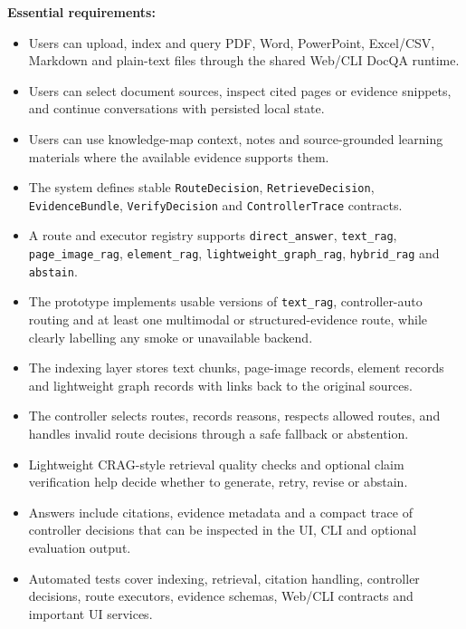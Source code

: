 \documentclass{article}
\begin{document}
\textbf{Essential requirements:}
\begin{itemize}
  \item Users can upload, index and query PDF, Word, PowerPoint, Excel/CSV, Markdown and plain-text files through the shared Web/CLI DocQA runtime.
  \item Users can select document sources, inspect cited pages or evidence snippets, and continue conversations with persisted local state.
  \item Users can use knowledge-map context, notes and source-grounded learning materials where the available evidence supports them.
  \item The system defines stable \texttt{RouteDecision}, \texttt{RetrieveDecision}, \texttt{EvidenceBundle}, \texttt{VerifyDecision} and \texttt{ControllerTrace} contracts.
  \item A route and executor registry supports \texttt{direct\_answer}, \texttt{text\_rag}, \texttt{page\_image\_rag}, \texttt{element\_rag}, \texttt{lightweight\_graph\_rag}, \texttt{hybrid\_rag} and \texttt{abstain}.
  \item The prototype implements usable versions of \texttt{text\_rag}, controller-auto routing and at least one multimodal or structured-evidence route, while clearly labelling any smoke or unavailable backend.
  \item The indexing layer stores text chunks, page-image records, element records and lightweight graph records with links back to the original sources.
  \item The controller selects routes, records reasons, respects allowed routes, and handles invalid route decisions through a safe fallback or abstention.
  \item Lightweight CRAG-style retrieval quality checks and optional claim verification help decide whether to generate, retry, revise or abstain.
  \item Answers include citations, evidence metadata and a compact trace of controller decisions that can be inspected in the UI, CLI and optional evaluation output.
  \item Automated tests cover indexing, retrieval, citation handling, controller decisions, route executors, evidence schemas, Web/CLI contracts and important UI services.
\end{itemize}
\end{document}
